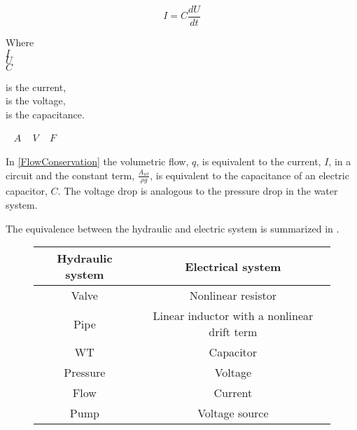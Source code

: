 \begin{equation}
  I = C \frac{dU}{dt}
  \label{ElecCircuirt}
\end{equation}

\begin{minipage}[t]{0.20\textwidth}
Where\\
\hspace*{8mm} $I$ \\
\hspace*{8mm} $U$ \\
\hspace*{8mm} $C$ 
\end{minipage}
\begin{minipage}[t]{0.68\textwidth}
\vspace*{2mm}
is the current,\\
is the voltage,\\
is the capacitance.
\end{minipage}
\begin{minipage}[t]{0.10\textwidth}
\vspace*{2mm}
\textcolor{White}{te}$\unit{A}$
\textcolor{White}{te}$\unit{V}$
\textcolor{White}{te}$\unit{F}$
\end{minipage}

In \eqref{FlowConservation} the volumetric flow, $q$, is equivalent to the current, $I$, in a circuit and the constant term, $\frac{A_{wt}}{\rho g}$, is equivalent to the capacitance of an electric capacitor, $C$. The voltage drop is analogous to the pressure drop in the water system.


%
%
The equivalence between the hydraulic and electric system is summarized in .

\begin{figure}[H]
	\centering
\begin{tabular}{c|c} 
  			\bfseries Hydraulic system    &     \bfseries Electrical system  \\ \hline
			Valve		  	  &     Nonlinear resistor   \\ 
			Pipe              &     Linear inductor with a nonlinear drift term       \\ 
			WT 		          &     Capacitor       \\
			Pressure	 	  &     Voltage    \\
			Flow 		      &     Current       \\  
			Pump 		      &     Voltage source           
\end{tabular}
		\label{tab:hydraulic_electrical}

\end{figure}	


	
